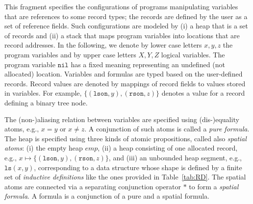\documentclass[twoside,11pt]{article}
\newcommand{\posep}{*}
\newcommand{\points}{\mapsto}
\newcommand{\nil}{\mathtt{nil}}
\newcommand{\ls}{\mathtt{ls}}
\begin{document}
This fragment specifies the configurations of programs manipulating variables that are references to some record types; the records are defined by the user as a set of reference fields.
Such configurations are modeled by
(i) a heap that is a set of records and
(ii) a stack that maps program variables into locations that are record addresses.
%
In the following, we denote by lower case letters $x,y,z$ the program variables and by upper case letters $X,Y,Z$ logical variables. The program variable $\nil$ has a fixed meaning representing an undefined (not allocated) location.
%
Variables and formulas are typed based on the user-defined records. Record values are denoted by mappings of record fields to values stored in variables. For example, $\{(\texttt{lson},y), (\texttt{rson},z)\}$ denotes a value for a record defining a binary tree node.

The (non-)aliasing relation between variables are specified using (dis-)equality atoms, e.g., $x = y$ or $x\neq z$. A conjunction of such atoms is called a \emph{pure formula}. 
%
The heap is specified using three kinds of atomic propositions, called also \emph{spatial atoms}:
(i) the empty heap $\mathit{emp}$, 
(ii) a heap consisting of one allocated record, e.g., $x \points \{(\texttt{lson},y), (\texttt{rson},z)\}$,
and
(iii) an unbounded heap segment, e.g., $\ls(x,y)$, corresponding to a data structure whose shape is defined by a finite set of \emph{inductive definitions} like the ones provided in Table~\ref{tab:RD}. 
The spatial atoms are connected via a separating conjunction operator $\posep$ to form a \emph{spatial formula}. 
A formula is a conjunction of a pure and a spatial formula.
\end{document}
